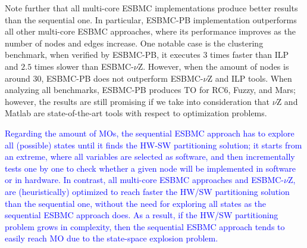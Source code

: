 \documentclass{doublecol-new}
\theoremstyle{TH}{
\newtheorem{lemma}{Lemma}
\newtheorem{theorem}[lemma]{Theorem}
\newtheorem{corrolary}[lemma]{Corrolary}
\newtheorem{conjecture}[lemma]{Conjecture}
\newtheorem{proposition}[lemma]{Proposition}
\newtheorem{claim}[lemma]{Claim}
\newtheorem{stheorem}[lemma]{Wrong Theorem}
\newtheorem{algorithm}{Algorithm}
}
\theoremstyle{THrm}{
\newtheorem{definition}{Definition}[section]
\newtheorem{question}{Question}[section]
\newtheorem{remark}{Remark}
\newtheorem{scheme}{Scheme}
}
\theoremstyle{THhit}{
\newtheorem{case}{Case}[section]
}
\begin{document}
Note further that all multi-core ESBMC implementations produce better results than the sequential one. In particular, ESBMC-PB implementation outperforms all other multi-core ESBMC approaches, where its performance improves as the number of nodes and edges increase. One notable case is the clustering benchmark, when verified by ESBMC-PB, it executes $3$ times faster than ILP and $2$.$5$ times slower than ESBMC-$\nu$Z. However, when the amount of nodes is around $30$, ESBMC-PB does not outperform ESBMC-$\nu$Z and ILP tools. When analyzing all benchmarks, ESBMC-PB produces TO for RC$6$, Fuzzy, and Mars; however, the results are still promising if we take into consideration that $\nu$Z and Matlab are state-of-the-art tools with respect to optimization problems.

\textcolor{blue}{Regarding the amount of MOs, the sequential ESBMC approach has to explore all (possible) states until it finds the HW-SW partitioning solution; it starts from an extreme, where all variables are selected as software, and then incrementally tests one by one to check whether a given node will be implemented in software or in hardware. In contrast, all multi-core ESBMC approaches and ESBMC-$\nu$Z, are (heuristically) optimized to reach faster the HW/SW partitioning solution than the sequential one, without the need for exploring all states as the sequential ESBMC approach does. As a result, if the HW/SW partitioning problem grows in complexity, then the sequential ESBMC approach tends to easily reach MO due to the state-space explosion problem.}
\end{document}
